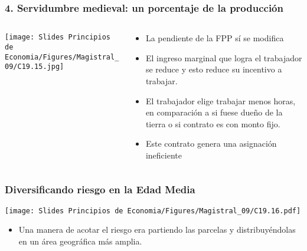 \documentclass{beamer}
\begin{document}
\begin{frame}
\frametitle{4. Servidumbre medieval: un porcentaje de la producción}
\begin{columns}
  \begin{column}{0.55\textwidth}
    \centering
    \texttt{[image: Slides Principios de Economia/Figures/Magistral\_09/C19.15.jpg]}
  \end{column}

\begin{column}{0.45\textwidth}
    \begin{itemize}
        \item \small La pendiente de la FPP sí se modifica
        \item \small El ingreso marginal que logra el trabajador se reduce y esto reduce su incentivo a trabajar.
        \item \small El trabajador elige trabajar menos horas, en comparación a si fuese dueño de la tierra o si contrato es con monto fijo.
        \item \small Este contrato genera una asignación ineficiente
    \end{itemize}
  \end{column}
\end{columns}

\end{frame}


\begin{frame}
\frametitle{Diversificando riesgo en la Edad Media}
\centering
\texttt{[image: Slides Principios de Economia/Figures/Magistral\_09/C19.16.pdf]}

\begin{itemize}
    \item Una manera de acotar el riesgo era partiendo las parcelas y distribuyéndolas en un área geográfica más amplia. 
\end{itemize}
\end{frame}
\end{document}

